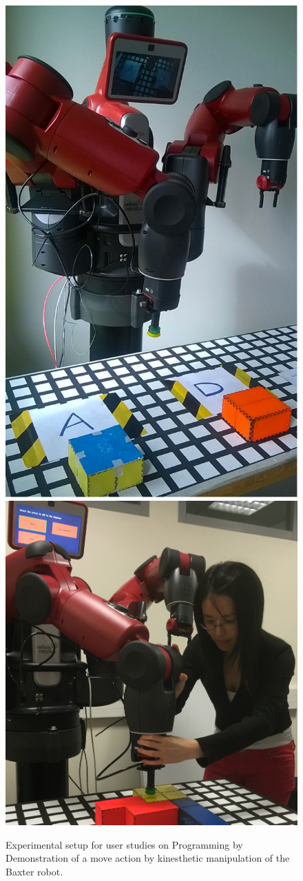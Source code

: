  \begin{figure}[htp]
 	\centering
 	\includegraphics[width=.3\textwidth]{figures/experiment1}\hspace{1cm}%
 	\includegraphics[width=.3\textwidth]{figures/experiment-setup2}
 	
 	\caption{Experimental setup for user studies on Programming by Demonstration of a move action by kinesthetic manipulation of the Baxter robot.}
 	\label{fig:Baxter}
 	
 \end{figure}






